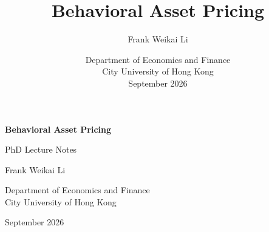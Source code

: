 \documentclass[11pt,letterpaper,openany]{book}
\title{Behavioral Asset Pricing}
\author{Frank Weikai Li}
\date{Department of Economics and Finance\\City University of Hong Kong\\[1em]September 2026}
\begin{document}
\let\cleardoublepage\clearpage

\begin{titlepage}
\centering
\vspace*{2in}
{\Huge\bfseries Behavioral Asset Pricing\par}
\vspace{0.6in}
{\Large PhD Lecture Notes\par}
\vspace{1.2in}
{\large Frank Weikai Li\par}
\vspace{0.15in}
{\normalsize Department of Economics and Finance\\City University of Hong Kong\par}
\vspace{0.5in}
{\normalsize September 2026\par}
\vfill
\end{titlepage}

\frontmatter
\tableofcontents
\listoffigures
\listoftables

\mainmatter











\clearpage
\printbibliography[heading=bibintoc]
\end{document}
